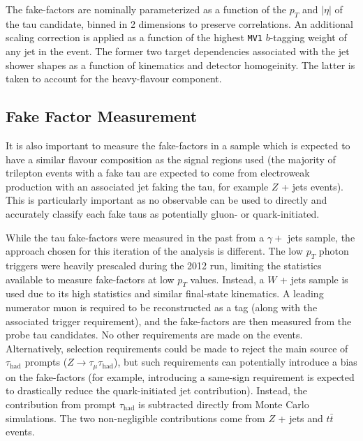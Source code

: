 The fake-factors are nominally parameterized as a function of the $p_{T}$ and $|\eta|$ of the
tau candidate, binned in 2 dimensions to preserve correlations. An additional scaling
correction is applied as a function of the highest \texttt{MV1} $b$-tagging weight of any jet
in the event.  The former two target dependencies associated with the jet shower shapes as a
function of kinematics and detector homogeinity.  The latter is taken to account for the
heavy-flavour component.

\subsection{Fake Factor Measurement}\label{sec:ff-tau-measurement}

It is also important to measure the fake-factors in a sample which is expected to have a
similar flavour composition as the signal regions used (the majority of trilepton events
with a fake tau are expected to come from electroweak production with an associated jet
faking the tau, for example $Z$ + jets events).  This is particularly important as no
observable can be used to directly and accurately classify each fake taus as potentially
gluon- or quark-initiated.
 
While the tau fake-factors were measured in the past from a $\gamma + $ jets sample, the
approach chosen for this iteration of the analysis is different.  
The low $p_{T}$ photon triggers were heavily prescaled during the 2012 run, limiting the
statistics available to measure fake-factors at low $p_{T}$ values.  Instead, a $W$ + jets
sample is used due to its high statistics and similar final-state kinematics.  A leading
numerator muon is required to be reconstructed as a tag (along with the associated trigger
requirement), and the fake-factors are then measured from the probe tau candidates.  No
other requirements are made on the events.  Alternatively, selection requirements could be
made to reject the main source of $\tau_{\mathrm{had}}$ prompts ($Z\rightarrow
\tau_{\mu}\tau_{\mathrm{had}}$), but such requirements can potentially introduce a bias on
the fake-factors (for example, introducing a same-sign requirement is expected to
drastically reduce the quark-initiated jet contribution).  Instead, the contribution from
prompt $\tau_{\mathrm{had}}$ is subtracted directly from Monte Carlo simulations.  The two
non-negligible contributions come from $Z$ + jets and $t\bar{t}$ events.

